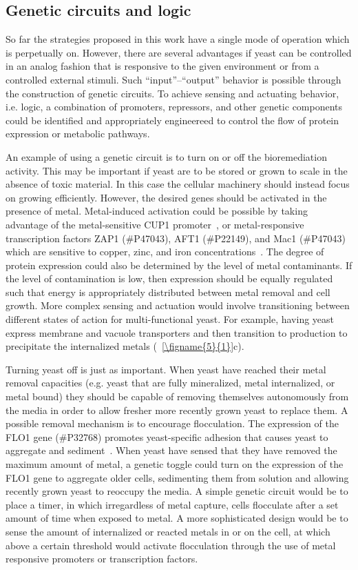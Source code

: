\documentclass[../main/main]{subfiles}
\begin{document}
\subsection{Genetic circuits and logic}
\label{subsection:chapter5:circuits}
So far the strategies proposed in this work have a single mode of operation which is perpetually on. However, there are several advantages if yeast can be controlled in an analog fashion that is responsive to the given environment or from a controlled external stimuli. Such ``input''--``output'' behavior is possible through the construction of genetic circuits. To achieve sensing and actuating behavior, i.e. logic, a combination of promoters, repressors, and other genetic components could be identified and appropriately engineereed to control the flow of protein expression or metabolic pathways.

An example of using a genetic circuit is to turn on or off the bioremediation activity. This may be important if yeast are to be stored or grown to scale in the absence of toxic material. In this case the cellular machinery should instead focus on growing efficiently. However, the desired genes should be activated in the presence of metal. Metal-induced activation could be possible by taking advantage of the metal-sensitive CUP1 promoter~\cite{jeyaprakash1991}, or metal-responsive transcription factors
ZAP1 (\#{}P47043),
AFT1 (\#{}P22149),
and Mac1 (\#{}P47043)
which are sensitive to copper, zinc, and iron concentrations~\cite{waldron2009}.
The degree of protein expression could also be determined by the level of metal contaminants. If the level of contamination is low, then expression should be equally regulated such that energy is appropriately distributed between metal removal and cell growth. More complex sensing and actuation would involve transitioning between different states of action for multi-functional yeast. For example, having yeast express membrane and vacuole transporters and then transition to \HS{} production to precipitate the internalized metals (\FIGURE~\ref{\figname{5}{1}}c).

Turning yeast off is just as important. When yeast have reached their metal removal capacities (e.g. yeast that are fully mineralized, metal internalized, or metal bound) they should be capable of removing themselves autonomously from the media in order to allow fresher more recently grown yeast to replace them. A possible removal mechanism is to encourage flocculation. The expression of the FLO1 gene (\#{}P32768) promotes yeast-specific adhesion that causes yeast to aggregate and sediment~\cite{verstrepen2006,ellis2009diversity}. When yeast have sensed that they have removed the maximum amount of metal, a genetic toggle could turn on the expression of the FLO1 gene to aggregate older cells, sedimenting them from solution and allowing recently grown yeast to reoccupy the media. A simple genetic circuit would be to place a timer, in which irregardless of metal capture, cells flocculate after a set amount of time when exposed to metal. A more sophisticated design would be to sense the amount of internalized or reacted metals in or on the cell, at which above a certain threshold would activate flocculation through the use of metal responsive promoters or transcription factors.
\end{document}
